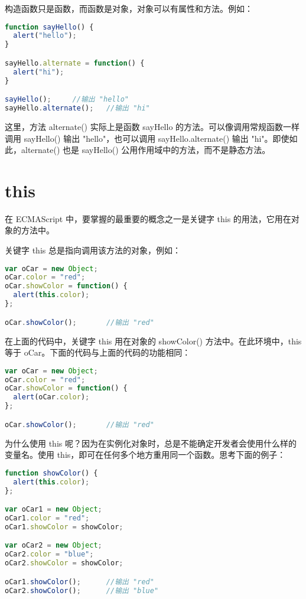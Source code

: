 构造函数只是函数，而函数是对象，对象可以有属性和方法。例如：



\begin{lstlisting}[language=JavaScript]
function sayHello() {
  alert("hello");
}

sayHello.alternate = function() {
  alert("hi");
}

sayHello();		//输出 "hello"
sayHello.alternate();	//输出 "hi"
\end{lstlisting}

这里，方法 alternate() 实际上是函数 sayHello 的方法。可以像调用常规函数一样调用 sayHello() 输出 "hello"，也可以调用 sayHello.alternate() 输出 "hi"。即使如此，alternate() 也是 sayHello() 公用作用域中的方法，而不是静态方法。


\section{this}


在 ECMAScript 中，要掌握的最重要的概念之一是关键字 this 的用法，它用在对象的方法中。


关键字 this 总是指向调用该方法的对象，例如：


\begin{lstlisting}[language=JavaScript]
var oCar = new Object;
oCar.color = "red";
oCar.showColor = function() {
  alert(this.color);
};

oCar.showColor();		//输出 "red"
\end{lstlisting}

在上面的代码中，关键字 this 用在对象的 showColor() 方法中。在此环境中，this 等于 oCar。下面的代码与上面的代码的功能相同：

\begin{lstlisting}[language=JavaScript]
var oCar = new Object;
oCar.color = "red";
oCar.showColor = function() {
  alert(oCar.color);
};

oCar.showColor();		//输出 "red"
\end{lstlisting}



为什么使用 this 呢？因为在实例化对象时，总是不能确定开发者会使用什么样的变量名。使用 this，即可在任何多个地方重用同一个函数。思考下面的例子：


\begin{lstlisting}[language=JavaScript]
function showColor() {
  alert(this.color);
};

var oCar1 = new Object;
oCar1.color = "red";
oCar1.showColor = showColor;

var oCar2 = new Object;
oCar2.color = "blue";
oCar2.showColor = showColor;

oCar1.showColor();		//输出 "red"
oCar2.showColor();		//输出 "blue"
\end{lstlisting}


